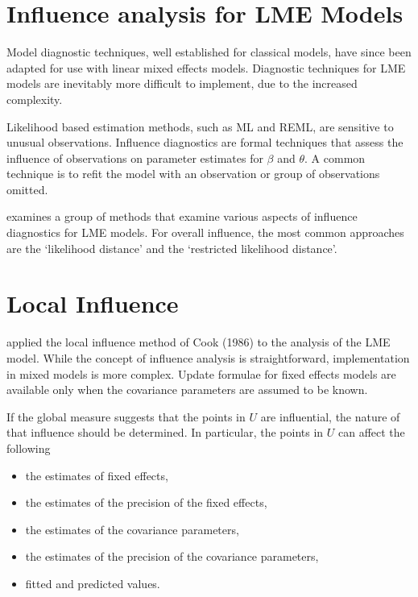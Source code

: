 \documentclass[12pt, a4paper]{report}
\theoremstyle{plain}
\theoremstyle{definition}
\theoremstyle{remark}
\begin{document}
\section{Influence analysis for LME Models} %


Model diagnostic techniques, well established for classical models, have since been adapted for use with linear mixed effects models. Diagnostic techniques for LME models are inevitably more difficult to implement, due to the increased complexity.

Likelihood based estimation methods, such as ML and REML, are sensitive to unusual observations. Influence diagnostics are formal techniques that assess the influence of observations on parameter estimates for $\beta$ and $\theta$. A common technique is to refit the model with an observation or group of observations omitted.

\citet{west} examines a group of methods that examine various aspects of influence diagnostics for LME models.
For overall influence, the most common approaches are the `likelihood distance' and the `restricted likelihood distance'.


\section{Local Influence}
\citet{Beckman} applied the local influence method of Cook (1986) to the analysis of the LME model.
While the concept of influence analysis is straightforward, implementation in mixed models is more complex. Update formulae for fixed effects models are available only when the covariance parameters are assumed to be known.

If the global measure suggests that the points in $U$ are influential, the nature of that influence should be determined. In particular, the points in $U$ can affect the following

\begin{itemize}
	\item the estimates of fixed effects,
	\item the estimates of the precision of the fixed effects,
	\item the estimates of the covariance parameters,
	\item the estimates of the precision of the covariance parameters,
	\item fitted and predicted values.
\end{itemize}
\end{document}
